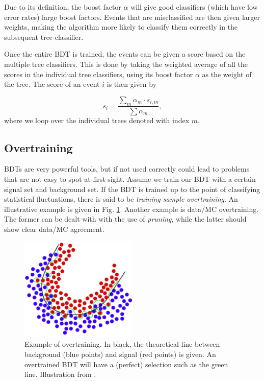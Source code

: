 Due to its definition, the boost factor $\alpha$ will give good classifiers (which have low error rates) large boost factors. Events that are misclassified are then given larger weights, making the algorithm more likely to classify them correctly in the subsequent tree classifier.

Once the entire BDT is trained, the events can be given a score based on the multiple tree classifiers. This is done by taking the weighted average of all the scores in the individual tree classifiers, using its boost factor $\alpha$ as the weight of the tree. The score of an event $i$ is then given by

\begin{equation}
s_i = \frac{\sum_m \alpha_m \cdot s_{i,m}}{\sum \alpha_m},
\end{equation}
\noindent where we loop over the individual trees denoted with index $m$.

\subsection{Overtraining}
\label{subsec:overtraining}
BDTs are very powerful tools, but if not used correctly could lead to problems that are not easy to spot at first sight. Assume we train our BDT with a certain signal set and background set. If the BDT is trained up to the point of classifying statistical fluctuations, there is said to be \textit{training sample overtraining}. An illustrative example is given in Fig. \ref{fig:overtraining}. Another example is data/MC overtraining. The former can be dealt with with the use of \textit{pruning}, while the latter should show clear data/MC agreement. 

\begin{figure}[t]
\centering
\includegraphics[width=0.5\textwidth]{chapter7/img/overtraining.png}
\caption{Example of overtraining. In black, the theoretical line between background (blue points) and signal (red points) is given. An overtrained BDT will have a (perfect) selection such as the green line. Illustration from \cite{boserpdf}.}
\label{fig:overtraining}
\end{figure}

